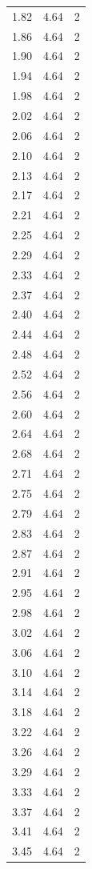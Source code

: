 \begin{longtable}{lrr}
  1.82 & 4.64 & 2 \\
  1.86 & 4.64 & 2 \\
  1.90 & 4.64 & 2 \\
  1.94 & 4.64 & 2 \\
  1.98 & 4.64 & 2 \\
  2.02 & 4.64 & 2 \\
  2.06 & 4.64 & 2 \\
  2.10 & 4.64 & 2 \\
  2.13 & 4.64 & 2 \\
  2.17 & 4.64 & 2 \\
  2.21 & 4.64 & 2 \\
  2.25 & 4.64 & 2 \\
  2.29 & 4.64 & 2 \\
  2.33 & 4.64 & 2 \\
  2.37 & 4.64 & 2 \\
  2.40 & 4.64 & 2 \\
  2.44 & 4.64 & 2 \\
  2.48 & 4.64 & 2 \\
  2.52 & 4.64 & 2 \\
  2.56 & 4.64 & 2 \\
  2.60 & 4.64 & 2 \\
  2.64 & 4.64 & 2 \\
  2.68 & 4.64 & 2 \\
  2.71 & 4.64 & 2 \\
  2.75 & 4.64 & 2 \\
  2.79 & 4.64 & 2 \\
  2.83 & 4.64 & 2 \\
  2.87 & 4.64 & 2 \\
  2.91 & 4.64 & 2 \\
  2.95 & 4.64 & 2 \\
  2.98 & 4.64 & 2 \\
  3.02 & 4.64 & 2 \\
  3.06 & 4.64 & 2 \\
  3.10 & 4.64 & 2 \\
  3.14 & 4.64 & 2 \\
  3.18 & 4.64 & 2 \\
  3.22 & 4.64 & 2 \\
  3.26 & 4.64 & 2 \\
  3.29 & 4.64 & 2 \\
  3.33 & 4.64 & 2 \\
  3.37 & 4.64 & 2 \\
  3.41 & 4.64 & 2 \\
  3.45 & 4.64 & 2 \\

\end{longtable}
